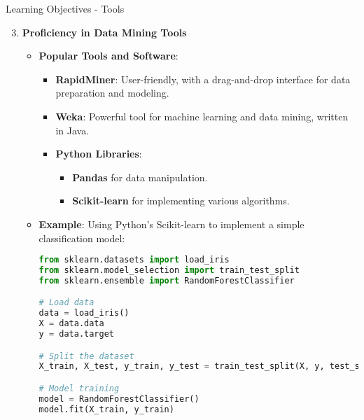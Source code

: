 \documentclass[aspectratio=169]{beamer}
\begin{document}
\begin{frame}[fragile]{Learning Objectives - Tools}
    \begin{enumerate}
        \setcounter{enumi}{2}
        \item \textbf{Proficiency in Data Mining Tools}
        \begin{itemize}
            \item \textbf{Popular Tools and Software}:
            \begin{itemize}
                \item \textbf{RapidMiner}: User-friendly, with a drag-and-drop interface for data preparation and modeling.
                \item \textbf{Weka}: Powerful tool for machine learning and data mining, written in Java.
                \item \textbf{Python Libraries}:
                \begin{itemize}
                    \item \textbf{Pandas} for data manipulation.
                    \item \textbf{Scikit-learn} for implementing various algorithms.
                \end{itemize}
            \end{itemize}
            \item \textbf{Example}: Using Python’s Scikit-learn to implement a simple classification model:
            \begin{lstlisting}[language=Python]
from sklearn.datasets import load_iris
from sklearn.model_selection import train_test_split
from sklearn.ensemble import RandomForestClassifier

# Load data
data = load_iris()
X = data.data
y = data.target

# Split the dataset
X_train, X_test, y_train, y_test = train_test_split(X, y, test_size=0.2)

# Model training
model = RandomForestClassifier()
model.fit(X_train, y_train)
            \end{lstlisting}
        \end{itemize}
    \end{enumerate}
\end{frame}
\end{document}

